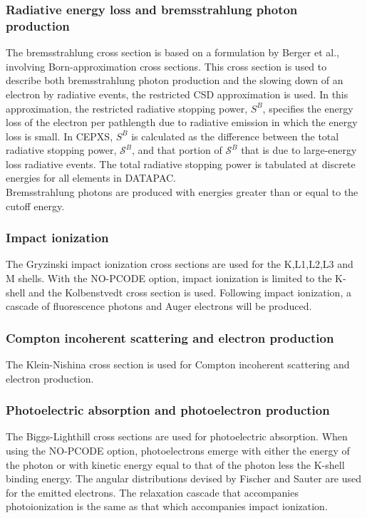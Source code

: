 \subsubsection{Radiative energy loss and bremsstrahlung photon production}
The bremsstrahlung cross section is based on a formulation by Berger et al.,
involving Born-approximation cross sections. This
cross section is used to describe both bremsstrahlung photon production and
the slowing down of an electron by radiative events, the restricted CSD
approximation is used. In this approximation, the restricted radiative
stopping power, $S^B$, specifies the energy loss of the electron per
pathlength due to radiative emission in which the energy loss is small. In
CEPXS, $S^B$ is calculated as the difference between the total radiative
stopping power, $\mathcal{S}^B$, and that portion of $\mathcal{S}^B$ that is
due to large-energy loss radiative events. The total radiative stopping power
is tabulated at discrete energies for all elements in DATAPAC.\\
Bremsstrahlung photons are produced with energies greater than or equal to the
cutoff energy. 

\subsubsection{Impact ionization}
The Gryzinski impact ionization cross sections are used for the K,L1,L2,L3 and
M shells. With the NO-PCODE option, impact ionization is limited to the
K-shell and the Kolbenstvedt cross section is used. Following impact
ionization, a cascade of fluorescence photons and Auger electrons will be
produced. 

\subsubsection{Compton incoherent scattering and electron production}
The Klein-Nishina cross section is used for Compton incoherent scattering and
electron production. 

\subsubsection{Photoelectric absorption and photoelectron production}
The Biggs-Lighthill cross sections are used for photoelectric absorption. When
using the NO-PCODE option, photoelectrons emerge with either the energy of the
photon or with kinetic energy equal to that of the photon less the K-shell
binding energy. The angular distributions devised by Fischer and Sauter are
used for the emitted electrons. The relaxation cascade that accompanies
photoionization is the same as that which accompanies impact ionization.

